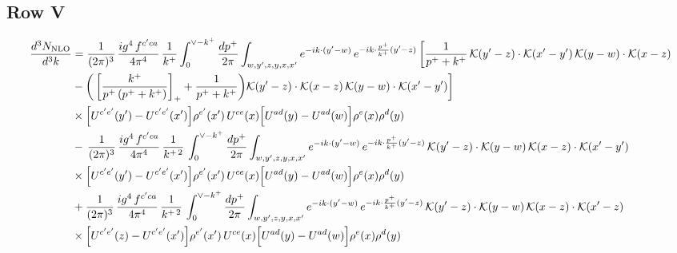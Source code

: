 \documentclass[9pt]{article}
\numberwithin{equation}{section}
\begin{document}
\subsection{Row V}
\begin{align}
\frac{d^{3}N_{\rm NLO}}{d^{3}k} & = \frac{1}{(2\pi)^{3}}\,\frac{ig^{4}\,f^{c'ca}}{4\pi^{4}}\,\frac{1}{k^{+}}\int_{0}^{\vee-k^{+}}\frac{dp^{+}}{2\pi}\int_{w,y',z,y,x,x'}e^{-ik\cdot(y'-w)}\,e^{-ik\cdot\frac{p^{+}}{k^{+}}(y'-z)}\,\bigg[\frac{1}{p^{+}+k^{+}}\,\mathcal{K}(y'-z)\cdot\mathcal{K}(x'-y')\,\mathcal{K}(y-w)\cdot\mathcal{K}(x-z)\notag \\ & -\bigg(\left[\frac{k^{+}}{p^{+}\,(p^{+}+k^{+})}\right]_{+}+\frac{1}{p^{+}+k^{+}}\bigg)\mathcal{K}(y'-z)\cdot\mathcal{K}(x-z)\,\mathcal{K}(y-w)\cdot\mathcal{K}(x'-y')\bigg]\notag \\ & \times\Big[U^{c'e'}(y')-U^{c'e'}(x')\Big]\rho^{e'}(x')\,U^{ce}(x)\Big[U^{ad}(y)-U^{ad}(w)\Big]\rho^{e}(x)\rho^{d}(y)\notag\\
&-\,\frac{1}{(2\pi)^{3}}\,\frac{ig^{4}\,f^{c'ca}}{4\pi^{4}}\,\frac{1}{k^{+\,2}}\,\int_{0}^{\vee-k^{+}}\frac{dp^{+}}{2\pi}\int_{w,y',z,y,x,x'}e^{-ik\cdot(y'-w)}\,e^{-ik\cdot\frac{p^{+}}{k^{+}}(y'-z)}\,\mathcal{K}(y'-z)\cdot\mathcal{K}(y-w)\,\mathcal{K}(x-z)\cdot\mathcal{K}(x'-y')\notag \\ & \times\Big[U^{c'e'}(y')-U^{c'e'}(x')\Big]\rho^{e'}(x')\,U^{ce}(x)\Big[U^{ad}(y)-U^{ad}(w)\Big]\rho^{e}(x)\rho^{d}(y)\notag\\
&+\frac{1}{(2\pi)^{3}}\,\frac{ig^{4}\,f^{c'ca}}{4\pi^{4}}\,\frac{1}{k^{+\,2}}\,\int_{0}^{\vee-k^{+}}\frac{dp^{+}}{2\pi}\int_{w,y',z,y,x,x'}e^{-ik\cdot(y'-w)}\,e^{-ik\cdot\frac{p^{+}}{k^{+}}(y'-z)}\,\mathcal{K}(y'-z)\cdot\mathcal{K}(y-w)\,\mathcal{K}(x-z)\cdot\mathcal{K}(x'-z)\notag \\ & \times\Big[U^{c'e'}(z)-U^{c'e'}(x')\Big]\rho^{e'}(x')\,U^{ce}(x)\Big[U^{ad}(y)-U^{ad}(w)\Big]\rho^{e}(x)\rho^{d}(y)
\end{align}
\end{document}
